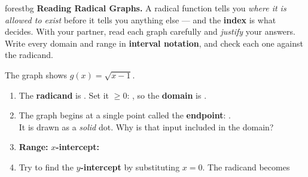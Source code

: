 \documentclass[10pt]{article}
\newcommand{\lgrid}[4]{%
  \draw[step=1, linegray!40, very thin] (#1,#3) grid (#2,#4);
  \draw[->, semithick, charcoal] (#1,0)--(#2,0) node[below right, font=\scriptsize]{$x$};
  \draw[->, semithick, charcoal] (0,#3)--(0,#4) node[left, font=\scriptsize]{$y$};}
\begin{document}
\namepartnerperiod

\vspace{0.08in}

\begin{headlinebox}{forestbg}
\small\textbf{Reading Radical Graphs.} A radical function tells you \emph{where it is allowed to
exist} before it tells you anything else --- and the \textbf{index} is what decides. With your
partner, read each graph carefully and \emph{justify} your answers. Write every domain and range in
\textbf{interval notation}, and check each one against the radicand.
\end{headlinebox}

\vspace{0.06in}

\begin{tcolorbox}[colback=white, colframe=black!40, title=\textbf{Tier R --- Remediate},
    fonttitle=\bfseries, arc=1.5mm, left=3mm, right=3mm, top=2mm, bottom=2mm, breakable]
The graph shows $g(x) = \sqrt{x-1}$.
\begin{center}
\end{center}
\begin{enumerate}[leftmargin=1.7em, itemsep=7pt]
  \item The \textbf{radicand} is . Set it $\ge 0$: , so the
        \textbf{domain} is \ans{$[1,\infty)$}.
  \item The graph begins at a single point called the \textbf{endpoint}: . \\
        It is drawn as a \emph{solid} dot. Why is that input included in the domain?
  \item \textbf{Range:} \ans{$[0,\infty)$} \quad \textbf{$x$-intercept:} 
  \item Try to find the \textbf{$y$-intercept} by substituting $x=0$. The radicand becomes

\end{enumerate}
\end{tcolorbox}
\end{document}
